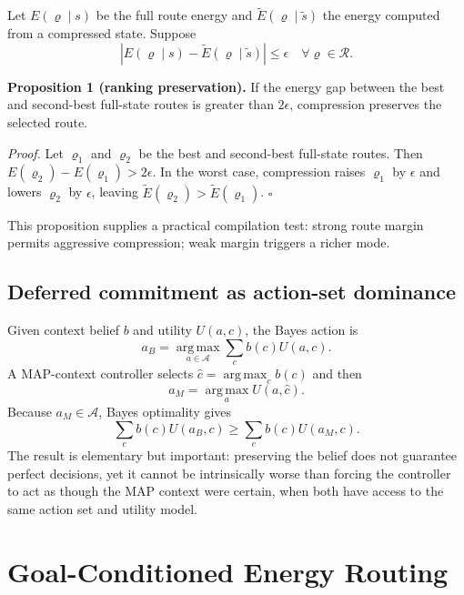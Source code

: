 \documentclass[10pt]{article}
\newcommand{\A}{\mathcal{A}}
\newcommand{\Rset}{\mathcal{R}}
\newcommand{\argmax}{\operatorname*{arg\,max}}
\begin{document}
Let $E(\varrho\mid s)$ be the full route energy and $\tilde E(\varrho\mid\tilde s)$ the energy computed from a compressed state. Suppose
\begin{equation}
  |E(\varrho\mid s)-\tilde E(\varrho\mid\tilde s)|\le\epsilon
  \quad\forall\varrho\in\Rset.
  \label{eq:uniformerror}
\end{equation}

\textbf{Proposition 1 (ranking preservation).} If the energy gap between the best and second-best full-state routes is greater than $2\epsilon$, compression preserves the selected route.

\textit{Proof.} Let $\varrho_1$ and $\varrho_2$ be the best and second-best full-state routes. Then
$E(\varrho_2)-E(\varrho_1)>2\epsilon$. In the worst case, compression raises $\varrho_1$ by $\epsilon$ and lowers $\varrho_2$ by $\epsilon$, leaving $\tilde E(\varrho_2)>\tilde E(\varrho_1)$. \hfill$\square$

This proposition supplies a practical compilation test: strong route margin permits aggressive compression; weak margin triggers a richer mode.

\subsection{Deferred commitment as action-set dominance}

Given context belief $b$ and utility $U(a,c)$, the Bayes action is
\begin{equation}
  a_B=\argmax_{a\in\A}\sum_c b(c)U(a,c).
\end{equation}
A MAP-context controller selects $\hat c=\argmax_c b(c)$ and then
\begin{equation}
  a_M=\argmax_a U(a,\hat c).
\end{equation}
Because $a_M\in\A$, Bayes optimality gives
\begin{equation}
  \sum_c b(c)U(a_B,c)\ge \sum_c b(c)U(a_M,c).
\end{equation}
The result is elementary but important: preserving the belief does not guarantee perfect decisions, yet it cannot be intrinsically worse than forcing the controller to act as though the MAP context were certain, when both have access to the same action set and utility model.

\section{Goal-Conditioned Energy Routing}
\end{document}
